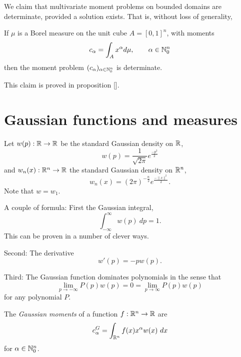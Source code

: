 We claim that multivariate moment problems on bounded domains are determinate, provided a solution exists. That is, without loss of generality,
\begin{myclaim}
  If $\mu$ is a Borel measure on the unit cube $A = {[0,1]}^n$, with moments
  \[
    c_\alpha = \int_{A} x^\alpha d\mu, \qquad \alpha \in \mathbb{N}_0^n
  \]
  then the moment problem $(c_\alpha)_{\alpha \in \mathbb{N}_0^n}$ is determinate.
\end{myclaim}
This claim is proved in proposition [].


\section{Gaussian functions and measures}
\begin{definition}
  Let $w(p) : \mathbb{R} \rightarrow \mathbb{R}$  be the standard Gaussian density on $\mathbb{R}$,
  \[
    w(p) = \frac1{\sqrt{2\pi}} e^{\frac{-p^2}2}
  \]
  and $w_n(x) : \mathbb{R}^n \rightarrow \mathbb{R}$ the standard Gaussian density on $\mathbb{R}^n$,
  \[
    w_n(x) = {(2\pi)}^{-\frac n2} e^{\frac{-\|x\|^2}2}.
  \]
  Note that $w = w_1$.
\end{definition}

A couple of formula: First the Gaussian integral,
\[
  \int_{-\infty}^\infty w(p) ~dp = 1.
\]
This can be proven in a number of clever ways.

Second: The derivative
\[
  w'(p) = -pw(p).
\]

Third: The Gaussian function dominates polynomials in the sense that
\[
  \lim_{p \rightarrow -\infty} P(p)w(p) = 0 = \lim_{p \rightarrow \infty} P(p)w(p)
\]
for any polynomial $P$.

\begin{definition}
  The \textit{Gaussian moments} of a function $f: \mathbb{R}^n \rightarrow \mathbb{R}$ are
  \[
    c^G_\alpha = \int_{\mathbb{R}^n} f(x)x^\alpha w(x) ~dx
  \]
  for $\alpha \in \mathbb{N}_0^n$.
\end{definition}


